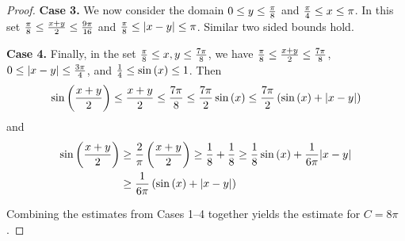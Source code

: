 \documentclass{amsart}
\begin{document}
\begin{proof}
\textbf{Case 3.} We now consider the domain $0 \leq y \leq {\pi \over 8}$ and ${\pi \over 4} \leq x \leq \pi$.  In this set 
${\pi \over 8} \leq {x+y\over 2} \leq {9 \pi \over 16}$ and ${\pi \over 8} \leq |x -y| \leq \pi$. Similar two sided bounds hold.
  
\textbf{Case 4.} Finally, in the set ${\pi \over 8} \leq x, y \leq {7 \pi \over 8}$, we have ${\pi \over 8} \leq {x+ y\over 2} \leq {7 \pi \over 8}$, $0 \leq |x-y| \leq {3 \pi \over 4}$, and ${1\over 4} \leq \sin\left( {x}\right) \leq 1$.  Then
\begin{align*}
\sin\left( {x + y\over 2} \right) \leq {x + y\over 2} \leq {7\pi \over 8} \leq {7\pi \over 2} \sin\left( {x}\right) \leq {7\pi \over 2} \left(\sin\left( {x}\right) + |x - y| \right) 
\end{align*}
and
\begin{align*}
\sin\left( {x + y\over 2} \right) & \geq {2 \over \pi} \left( {x + y\over 2} \right) \geq  
{1\over 8} + {1\over 8} \geq 
{1\over 8} \sin\left( {x}\right) 
+ {1 \over 6\pi} |x-y| \\
& 
\geq {1\over 6\pi}\left(\sin\left( {x }\right) + |x - y| \right) 
\end{align*}

Combining the estimates from Cases 1--4 together yields the estimate for $C = 8\pi$.

\end{proof}




\end{document}
